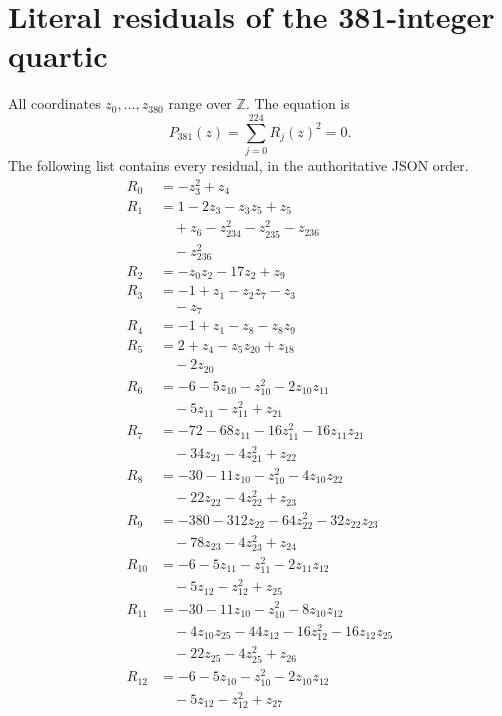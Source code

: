 \section{Literal residuals of the 381-integer quartic}
\label{app:integer381-residuals}
All coordinates $z_0,\ldots,z_{380}$ range over $\mathbb Z$. The equation is
\[P_{381}(z)=\sum_{j=0}^{224}R_j(z)^2=0.\]
The following list contains every residual, in the authoritative JSON order.
\begingroup\small\allowdisplaybreaks
\begin{align*}
R_{0} &= -z_{3}^{2} +z_{4} \\
R_{1} &= 1 -2z_{3} -z_{3}z_{5} +z_{5} \\
&\quad +z_{6} -z_{234}^{2} -z_{235}^{2} -z_{236} \\
&\quad -z_{236}^{2} \\
R_{2} &= -z_{0}z_{2} -17z_{2} +z_{9} \\
R_{3} &= -1 +z_{1} -z_{2}z_{7} -z_{3} \\
&\quad -z_{7} \\
R_{4} &= -1 +z_{1} -z_{8} -z_{8}z_{9} \\
R_{5} &= 2 +z_{4} -z_{5}z_{20} +z_{18} \\
&\quad -2z_{20} \\
R_{6} &= -6 -5z_{10} -z_{10}^{2} -2z_{10}z_{11} \\
&\quad -5z_{11} -z_{11}^{2} +z_{21} \\
R_{7} &= -72 -68z_{11} -16z_{11}^{2} -16z_{11}z_{21} \\
&\quad -34z_{21} -4z_{21}^{2} +z_{22} \\
R_{8} &= -30 -11z_{10} -z_{10}^{2} -4z_{10}z_{22} \\
&\quad -22z_{22} -4z_{22}^{2} +z_{23} \\
R_{9} &= -380 -312z_{22} -64z_{22}^{2} -32z_{22}z_{23} \\
&\quad -78z_{23} -4z_{23}^{2} +z_{24} \\
R_{10} &= -6 -5z_{11} -z_{11}^{2} -2z_{11}z_{12} \\
&\quad -5z_{12} -z_{12}^{2} +z_{25} \\
R_{11} &= -30 -11z_{10} -z_{10}^{2} -8z_{10}z_{12} \\
&\quad -4z_{10}z_{25} -44z_{12} -16z_{12}^{2} -16z_{12}z_{25} \\
&\quad -22z_{25} -4z_{25}^{2} +z_{26} \\
R_{12} &= -6 -5z_{10} -z_{10}^{2} -2z_{10}z_{12} \\
&\quad -5z_{12} -z_{12}^{2} +z_{27} \\

\end{align*}

